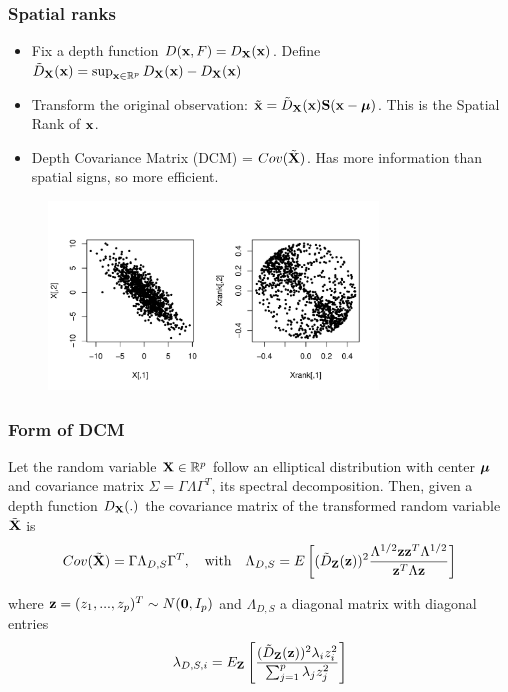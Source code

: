 \documentclass[handout,10pt]{beamer}
\begin{document}
\begin{frame}
\frametitle{Spatial ranks}

\begin{itemize}
\item Fix a depth function $D({\bf{x}}, F) = D_{\mathbf{X}}({\bf{x}})$. Define $ \tilde D_{\mathbf{X}}({\bf{x}}) = \sup_{{\bf{x}}\in \mathbb{R}^p} D_{\mathbf{X}}({\bf{x}}) - D_{\mathbf{X}}({\bf{x}}) $

\item Transform the original observation: $\tilde {{\bf{x}}} = \tilde D_{\mathbf{X}}({\bf{x}}) {\mathbf{S}}({\bf{x}} - {\boldsymbol{\mu}})$. This is the {\colbit Spatial Rank} of ${\bf{x}}$.

\item Depth Covariance Matrix (DCM) = $Cov(\tilde {{\mathbf{X}}})$. Has more information than spatial signs, so more efficient.
\end{itemize}

\begin{figure}\begin{center}
   \includegraphics[height=5cm]{ranks.pdf}
   \label{fig:fig3}
\end{center}\end{figure}
\end{frame}

\begin{frame}
\frametitle{Form of DCM}
\begin{theorem}[1]
Let the random variable ${\mathbf{X}} \in \mathbb{R}^p$ follow an elliptical distribution with center ${\boldsymbol{\mu}}$ and covariance matrix $\Sigma = \Gamma\Lambda\Gamma^T$, its spectral decomposition. Then, given a depth function $D_{\mathbf{X}}(.)$ the covariance matrix of the transformed random variable $\tilde{{\mathbf{X}}}$ is
\begin{equation}
Cov(\tilde {{\mathbf{X}}}) = \Gamma \Lambda_{D,S} \Gamma^T,\quad\mbox{with}\quad \Lambda_{D,S} = E \left[ (\tilde D_{\mathbf{Z}}({\bf{z}}))^2 \frac{\Lambda^{1/2} {\bf{z}} {\bf{z}}^T \Lambda^{1/2}}{{\bf{z}}^T \Lambda {\bf{z}}} \right]
\end{equation}

where ${\bf{z}} = (z_1,...,z_p)^T \sim N({\bf 0}, I_p)$ and $\Lambda_{D,S}$ a diagonal matrix with diagonal entries
$$ \lambda_{D,S,i} = E_{\mathbf{Z}} \left[ \frac{(\tilde D_{\mathbf{Z}}({\bf{z}}))^2 \lambda_i z_i^2}{\sum_{j=1}^p \lambda_j z_j^2} \right] $$
\end{theorem}
\end{frame}
\end{document}
